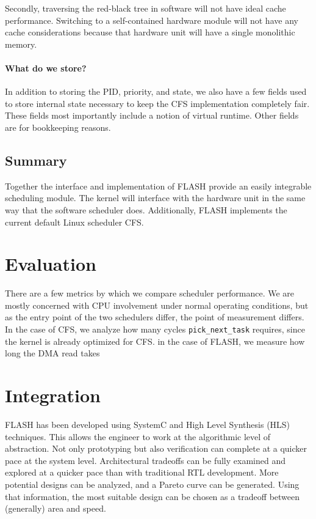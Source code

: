 \documentclass{sig-alternate-10pt}
\begin{document}
Secondly, traversing the red-black tree in software will not have ideal cache
performance. Switching to a self-contained hardware module will not have any
cache considerations because that hardware unit will have a single
monolithic memory.

\paragraph{What do we store?}
In addition to storing the PID, priority, and state, we also have a few
fields used to store internal state necessary to keep the CFS implementation
completely fair.  These fields most importantly include a notion of virtual
runtime.  Other fields are for bookkeeping reasons.

\subsection{Summary}
Together the interface and implementation of FLASH provide an easily
integrable scheduling module.  The kernel will interface with the hardware
unit in the same way that the software scheduler does.  Additionally, FLASH
implements the current default Linux scheduler CFS.

\section{Evaluation}

There are a few metrics by which we compare scheduler performance. We are mostly concerned with CPU involvement under normal operating conditions, but as the entry point of the two schedulers differ, the point of measurement differs. In the case of CFS, we analyze how many cycles \verb|pick_next_task| requires, since the kernel is already optimized for CFS. in the case of FLASH, we measure how long the DMA read takes

\section{Integration}
FLASH has been developed using SystemC and High Level Synthesis (HLS)
techniques.  This allows the engineer to work at the algorithmic level of
abstraction.  Not only prototyping but also verification can complete at a
quicker pace at the system level.  Architectural tradeoffs can be fully
examined and explored at a quicker pace than with traditional RTL
development.  More potential designs can be analyzed, and a Pareto curve can
be generated.  Using that information, the most suitable design can be
chosen as a tradeoff between (generally) area and speed.
\end{document}
